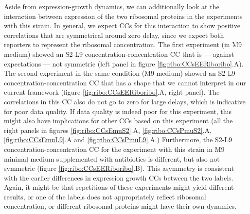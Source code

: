 Aside from expression-growth dynamics, we can additionally look at the interaction between expression of the two ribosomal proteins in the experiments with this strain. 
%
In general, we expect CCs for this interaction to show positive correlations that are symmetrical around zero delay, since we expect both reporters to represent the ribosomal concentration.
% 
The first experiment (in M9 medium) showed an S2-L9 concentration-concentration CC that is --- against expectations --- not symmetric (left panel in figure \ref{fig:ribo:CCsEERiboribo}.A).
%
%
The second experiment in the same condition (M9 medium)
showed an S2-L9 concentration-concentration CC that has a shape that we 
cannot interpret in our current framework (figure \ref{fig:ribo:CCsEERiboribo}.A, right panel).
The correlations in this CC also do not go to zero for large delays, which is indicative for poor data quality.
If data quality is indeed poor for this experiment, this might also have implications for other CCs based on this experiment (all the right panels in figures \ref{fig:ribo:CCsEmuS2}.A, \ref{fig:ribo:CCsPmuS2}.A, \ref{fig:ribo:CCsEmuL9}.A and \ref{fig:ribo:CCsPmuL9}.A.)
%
Furthermore, the S2-L9 concentration-concentration CC for the experiment with this strain in M9 minimal medium supplemented with antibiotics is different, but also not symmetric (figure \ref{fig:ribo:CCsEERiboribo}.B).
%
This asymmetry is consistent with the earlier differences in expression growth CCs between the two labels.
Again, it might be that 
repetitions of these experiments might yield different results, or one of the labels does not appropriately reflect ribosomal concentration, or different ribosomal proteins might have their own dynamics.




